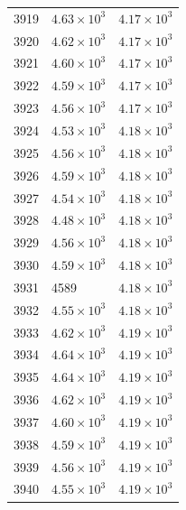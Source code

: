 \begin{table}[H]
\begin{tabular}{lll}
3919 & $\displaystyle 4.63 \times 10^{3}$ & $\displaystyle 4.17 \times 10^{3}$ \\
3920 & $\displaystyle 4.62 \times 10^{3}$ & $\displaystyle 4.17 \times 10^{3}$ \\
3921 & $\displaystyle 4.60 \times 10^{3}$ & $\displaystyle 4.17 \times 10^{3}$ \\
3922 & $\displaystyle 4.59 \times 10^{3}$ & $\displaystyle 4.17 \times 10^{3}$ \\
3923 & $\displaystyle 4.56 \times 10^{3}$ & $\displaystyle 4.17 \times 10^{3}$ \\
3924 & $\displaystyle 4.53 \times 10^{3}$ & $\displaystyle 4.18 \times 10^{3}$ \\
3925 & $\displaystyle 4.56 \times 10^{3}$ & $\displaystyle 4.18 \times 10^{3}$ \\
3926 & $\displaystyle 4.59 \times 10^{3}$ & $\displaystyle 4.18 \times 10^{3}$ \\
3927 & $\displaystyle 4.54 \times 10^{3}$ & $\displaystyle 4.18 \times 10^{3}$ \\
3928 & $\displaystyle 4.48 \times 10^{3}$ & $\displaystyle 4.18 \times 10^{3}$ \\
3929 & $\displaystyle 4.56 \times 10^{3}$ & $\displaystyle 4.18 \times 10^{3}$ \\
3930 & $\displaystyle 4.59 \times 10^{3}$ & $\displaystyle 4.18 \times 10^{3}$ \\
3931 & 4589 & $\displaystyle 4.18 \times 10^{3}$ \\
3932 & $\displaystyle 4.55 \times 10^{3}$ & $\displaystyle 4.18 \times 10^{3}$ \\
3933 & $\displaystyle 4.62 \times 10^{3}$ & $\displaystyle 4.19 \times 10^{3}$ \\
3934 & $\displaystyle 4.64 \times 10^{3}$ & $\displaystyle 4.19 \times 10^{3}$ \\
3935 & $\displaystyle 4.64 \times 10^{3}$ & $\displaystyle 4.19 \times 10^{3}$ \\
3936 & $\displaystyle 4.62 \times 10^{3}$ & $\displaystyle 4.19 \times 10^{3}$ \\
3937 & $\displaystyle 4.60 \times 10^{3}$ & $\displaystyle 4.19 \times 10^{3}$ \\
3938 & $\displaystyle 4.59 \times 10^{3}$ & $\displaystyle 4.19 \times 10^{3}$ \\
3939 & $\displaystyle 4.56 \times 10^{3}$ & $\displaystyle 4.19 \times 10^{3}$ \\
3940 & $\displaystyle 4.55 \times 10^{3}$ & $\displaystyle 4.19 \times 10^{3}$ \\

\end{tabular}
\end{table}
